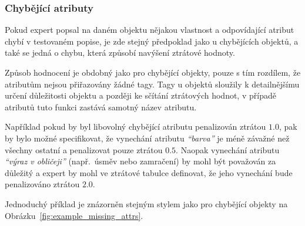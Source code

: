 \subsubsection{Chybějící atributy}
Pokud expert popsal na daném objektu nějakou vlastnost a odpovídající atribut chybí v testovaném popise,
je zde stejný předpoklad jako u chybějících objektů, a také se jedná o chybu, která způsobí navýšení ztrátové hodnoty.

Způsob hodnocení je obdobný jako pro chybějící objekty, pouze s tím rozdílem, že atributům nejsou přiřazovány žádné tagy.
Tagy u objektů sloužily k detailnějšímu určení důležitosti objektu a později ke sčítání ztrátových hodnot,
v případě atributů tuto funkci zastává samotný název atributu.

Například pokud by byl libovolný chybějící atributu penalizován ztrátou $1.0$, pak by bylo možné
specifikovat, že vynechání atributu \emph{\enquote{barva}} je méně závažné než všechny ostatní a penalizovat pouze ztrátou $0.5$.
Naopak vynechání atributu \emph{\enquote{výraz v obličeji}} (např.~úsměv nebo zamračení) by mohl být považován za důležitý a expert by
mohl ve ztrátové tabulce definovat, že jeho vynechání bude penalizováno ztrátou $2.0$.

Jednoduchý příklad je znázorněn stejným stylem jako pro chybějící objekty na Obrázku~\ref{fig:example_missing_attrs}.


